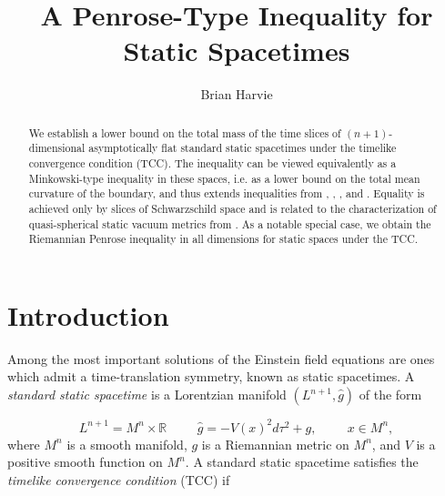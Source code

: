 \documentclass[12pt]{amsart}
\title{A Penrose-Type Inequality for Static Spacetimes}
\author{Brian Harvie}
\theoremstyle{definition}
\numberwithin{equation}{section}
\begin{document}
\begin{abstract}
We establish a lower bound on the total mass of the time slices of $(n+1)$-dimensional asymptotically flat standard static spacetimes under the timelike convergence condition (TCC). The inequality can be viewed equivalently as a Minkowski-type inequality in these spaces, i.e. as a lower bound on the total mean curvature of the boundary, and thus extends inequalities from \cite{BHW12}, \cite{W18}, \cite{M18}, and \cite{HW24a}. Equality is achieved only by slices of Schwarzschild space and is related to the characterization of quasi-spherical static vacuum metrics from \cite{HW24a}. As a notable special case, we obtain the Riemannian Penrose inequality in all dimensions for static spaces under the TCC.
\end{abstract}
\maketitle
\section{Introduction}
Among the most important solutions of the Einstein field equations are ones which admit a time-translation symmetry, known as static spacetimes. A  \textit{standard static spacetime} is a Lorentzian manifold $(L^{n+1}, \widehat{g})$ of the form

\begin{equation} \label{lorentzian}
    L^{n+1} = M^{n} \times \mathbb{R} \hspace{1cm} \widehat{g} = - V(x)^{2} d\tau^{2} + g, \hspace{1cm} x \in M^{n},
\end{equation}
where $M^{n}$ is a smooth manifold, $g$ is a Riemannian metric on $M^{n}$, and $V$ is a positive smooth function on $M^{n}$. A standard static spacetime satisfies the \textit{timelike convergence condition} (TCC) if
\end{document}
